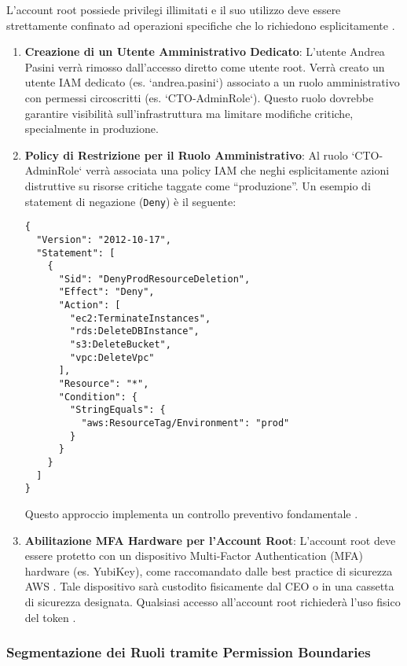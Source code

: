 L'account root possiede privilegi illimitati e il suo utilizzo deve essere strettamente confinato ad operazioni specifiche che lo richiedono esplicitamente \cite{aws:iam:bestpractices}.
\begin{enumerate}
    \item \textbf{Creazione di un Utente Amministrativo Dedicato}: L'utente Andrea Pasini verrà rimosso dall'accesso diretto come utente root. Verrà creato un utente IAM dedicato (es. `andrea.pasini`) associato a un ruolo amministrativo con permessi circoscritti (es. `CTO-AdminRole`). Questo ruolo dovrebbe garantire visibilità sull'infrastruttura ma limitare modifiche critiche, specialmente in produzione.
    \item \textbf{Policy di Restrizione per il Ruolo Amministrativo}: Al ruolo `CTO-AdminRole` verrà associata una policy IAM che neghi esplicitamente azioni distruttive su risorse critiche taggate come \enquote{produzione}. Un esempio di statement di negazione (\texttt{Deny}) è il seguente:
    \begin{lstlisting}[style=json, caption={Policy IAM per negare eliminazioni in produzione}, label=lst:deny-prod-delete]
{
  "Version": "2012-10-17",
  "Statement": [
    {
      "Sid": "DenyProdResourceDeletion",
      "Effect": "Deny",
      "Action": [
        "ec2:TerminateInstances",
        "rds:DeleteDBInstance",
        "s3:DeleteBucket",
        "vpc:DeleteVpc"
      ],
      "Resource": "*",
      "Condition": {
        "StringEquals": {
          "aws:ResourceTag/Environment": "prod"
        }
      }
    }
  ]
}
    \end{lstlisting}
    Questo approccio implementa un controllo preventivo fondamentale \cite{aws:iam:boundaries}.
    \item \textbf{Abilitazione MFA Hardware per l'Account Root}: L'account root deve essere protetto con un dispositivo Multi-Factor Authentication (MFA) hardware (es. YubiKey), come raccomandato dalle best practice di sicurezza AWS \cite{clouddefense:mfa}. Tale dispositivo sarà custodito fisicamente dal CEO o in una cassetta di sicurezza designata. Qualsiasi accesso all'account root richiederà l'uso fisico del token \cite{saraswat:breakglass}.
\end{enumerate}

\subsubsection{Segmentazione dei Ruoli tramite Permission Boundaries}


